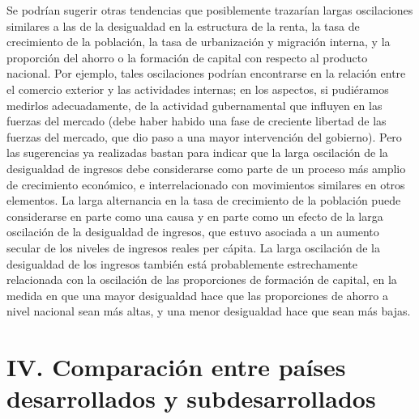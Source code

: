 Se podrían sugerir otras tendencias que posiblemente trazarían largas oscilaciones similares a las de la desigualdad en la estructura de la renta, la tasa de crecimiento de la población, la tasa de urbanización y migración interna, y la proporción del ahorro o la formación de capital con respecto al producto nacional. Por ejemplo, tales oscilaciones podrían encontrarse en la relación entre el comercio exterior y las actividades internas; en los aspectos, si pudiéramos medirlos adecuadamente, de la actividad gubernamental que influyen en las fuerzas del mercado (debe haber habido una fase de creciente libertad de las fuerzas del mercado, que dio paso a una mayor intervención del gobierno). Pero las sugerencias ya realizadas bastan para indicar que la larga oscilación de la desigualdad de ingresos debe considerarse como parte de un proceso más amplio de crecimiento económico, e interrelacionado con movimientos similares en otros elementos. La larga alternancia en la tasa de crecimiento de la población puede considerarse en parte como una causa y en parte como un efecto de la larga oscilación de la desigualdad de ingresos, que estuvo asociada a un aumento secular de los niveles de ingresos reales per cápita. La larga oscilación de la desigualdad de los ingresos también está probablemente estrechamente relacionada con la oscilación de las proporciones de formación de capital, en la medida en que una mayor desigualdad hace que las proporciones de ahorro a nivel nacional sean más altas, y una menor desigualdad hace que sean más bajas.

\section*{IV. Comparación entre países desarrollados y subdesarrollados}



